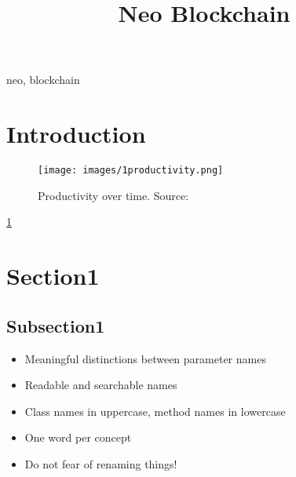 \documentclass[conference]{IEEEtran}
\begin{document}
\title{Neo Blockchain}

\author{
}

\maketitle

\begin{abstract}

\end{abstract}

\begin{IEEEkeywords}
neo, blockchain
\end{IEEEkeywords}

\section{Introduction}

\begin{figure}[!ht]
    \centering
    \texttt{[image: images/1productivity.png]}
    \caption{Productivity over time. Source: \cite[S.4]{martin2009clean}}
    \label{fig:productivity}
\end{figure}

\cite[S.7]{martin2009clean}

\ref{fig:productivity}

\section{Section1}

\subsection{Subsection1}

\begin{itemize}
    \item Meaningful distinctions between parameter names
    \item Readable and searchable names
    \item Class names in uppercase, method names in lowercase
    \item One word per concept
    \item Do not fear of renaming things!
\end{itemize}


 
\end{document}

